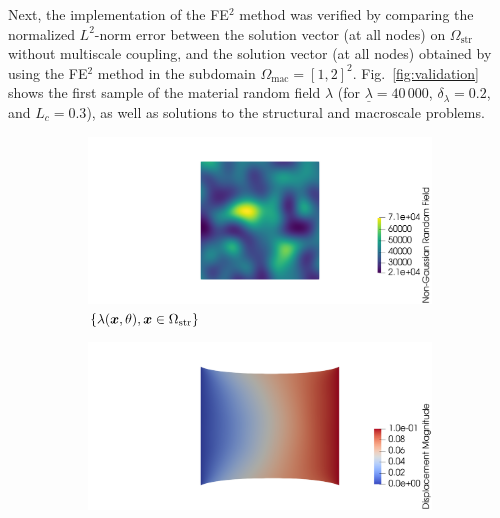 Next, the implementation of the FE$^2$ method was verified by comparing the normalized $L^2$-norm error between the solution vector (at all nodes) on $\Omega_\text{str}$ without multiscale coupling, and the solution vector (at all nodes) obtained by using the FE$^2$ method in the subdomain $\Omega_\text{mac} = [1, 2]^2$. Fig.~\ref{fig:validation} shows the first sample of the material random field $\lambda$ (for $\underline{\lambda} = 40\,000$, $\delta_{\lambda} = 0.2$, and $L_c = 0.3$), as well as solutions to the structural and macroscale problems. 
\begin{figure}[!htb]
    \begin{center}
        \begin{subfigure}[b]{0.32\textwidth}
            \begin{center}
                \includegraphics[trim = {12cm 0cm 0cm 0cm}, clip, width=\textwidth]{Pictures/lambda_11.png}
            \end{center}
            \caption{$\{\lambda({\boldsymbol{x}}, \theta), {\boldsymbol{x}} \in \Omega_{\text{str}}\}$}
        \end{subfigure}
        \begin{subfigure}[b]{0.32\textwidth}
            \begin{center}
                \includegraphics[trim = {12cm 0cm 0cm 0cm}, clip, width=\textwidth]{Pictures/omega_str_11.png}

\end{center}
\end{subfigure}
\end{center}
\end{figure}
